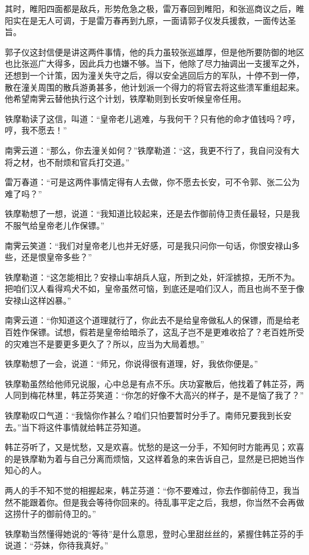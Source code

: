 \documentclass[12pt,oneside]{book}
\begin{document}
其时，睢阳四面都是敌兵，形势危急之极，雷万春回到睢阳，和张巡商议之后，睢阳实在是无人可调，于是雷万春再到九原，一面请郭子仪发兵援救，一面传达圣旨。

郭子仪这封信便是讲这两件事情，他的兵力虽较张巡雄厚，但是他所要防御的地区也比张巡广大得多，因此兵力也嫌不够。当下，他除了尽力抽调出一支援军之外，还想到一个计策，因为潼关失守之后，得以安全逃回后方的军队，十停不到一停，散在潼关周围的散兵游勇甚多，他计划派一个得力的将官去将这些溃军重组起来。他希望南霁云替他执行这个计划，铁摩勒则到长安听候皇帝任用。

铁摩勒读了这信，叫道：``皇帝老儿逃难，与我何干？只有他的命才值钱吗？哼，哼，我不愿去！''

南霁云道：``那么，你去潼关如何？''铁摩勒道：``这，我更不行了，我自问没有大将之材，也不耐烦和官兵打交道。''

雷万春道：``可是这两件事情定得有人去做，你不愿去长安，可不令郭、张二公为难了吗？''

铁摩勒想了一想，说道：``我知道比较起来，还是去作御前侍卫责任最轻，只是我不服气给皇帝老儿作保镖。''

南霁云笑道：``我们对皇帝老儿也并无好感，可是我只问你一句话，你恨安禄山多些，还是恨皇帝多些？''

铁摩勒道：``这怎能相比？安禄山率胡兵人寇，所到之处，奸淫掳掠，无所不为。把咱们汉人看得鸡犬不如，皇帝虽然可恼，到底还是咱们汉人，而且也尚不至于像安禄山这样凶暴。''

南霁云道：``你知道这个道理就行了，你此去不是给皇帝做私人的保镖，而是给老百姓作保镖。试想，假若是皇帝给暗杀了，这乱子岂不是更难收拾了？老百姓所受的灾难岂不是要更多更久了？所以，应当为大局着想。''

铁摩勒想了一会，说道：``师兄，你说得很有道理，好，我依你便是。''

铁摩勒虽然给他师兄说服，心中总是有点不乐。庆功宴散后，他找着了韩芷芬，两人同到梅花林里，韩芷芬笑道：``你怎的好像不大高兴的样子，是不是恼了我了？''

铁摩勒叹口气道：``我恼你作甚么？咱们只怕要暂时分手了。南师兄要我到长安去。''当下将这件事情就给韩芷芬知道。

韩芷芬听了，又是忧愁，又是欢喜。忧愁的是这一分手，不知何时方能再见；欢喜的是铁摩勒为着与自己分离而烦恼，又这样着急的来告诉自己，显然是已把她当作知心的人。

两人的手不知不觉的相握起来，韩芷芬道：``你不要难过，你去作御前侍卫，我当然不能跟着你。但是我会等待你回来的。待乱事平定之后，我想，你当然不会再做这捞什子的御前侍卫的。''

铁摩勒当然懂得她说的``等待''是什么意思，登时心里甜丝丝的，紧握住韩芷芬的手说道：``芬妹，你待我真好。''
\end{document}
